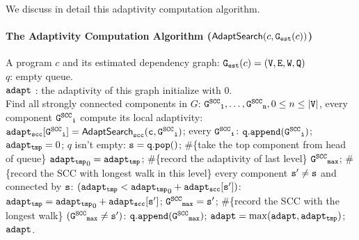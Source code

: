 We discuss in detail this adaptivity computation algorithm.
\paragraph*{The Adaptivity Computation Algorithm ($\mathsf{AdaptSearch}(c, \mathtt{{G_{est}}}(c))$)}
\begin{algorithm}
 \caption{
 {Adaptivity Computation Algorithm ({$\kw{\pathsearch(c, \progG(c))}$})}
 }
 \label{alg:adapt}
 \begin{algorithmic}[1]
 \REQUIRE A program $c$ and
 its estimated dependency graph: $\mathtt{{G_{est}}}(c) = (\mathtt{V}, \mathtt{E}, \mathtt{W}, \mathtt{Q})$
 \\
 $q$: empty queue.
 \\
 $\mathtt{adapt}$ : the adaptivity of this graph initialize with $0$.
 \\
 \STATE Find all strongly connected components in $G$: $\mathtt{\mathtt{G^{SCC}}_1}, \ldots, \mathtt{\mathtt{G^{SCC}}_n}, 0 \leq n \leq |\mathtt{V}|$, 
  every component $\mathtt{\mathtt{G^{SCC}}_i}$ compute its local adaptivity:
 \STATE \quad $\mathtt{adapt_{scc}[\mathtt{G^{SCC}}_i] = \mathsf{AdaptSearch}_{scc}(c, \mathtt{G^{SCC}}_i)}$;
  every $\mathtt{\mathtt{G^{SCC}}_i}$:
 \STATE \qquad $\mathtt{q.append(\mathtt{G^{SCC}}_i)}$;
 \STATE \qquad $\mathtt{adapt_{tmp}} = 0$;
 \STATE {} $q$ isn't empty:
 \STATE \qquad \qquad $\mathtt{s = q.pop()}$; \#\{take the top component from head of queue\}
 \STATE \qquad \qquad $\mathtt{adapt_{tmp}}_0= \mathtt{adapt_{tmp}}$; \#\{record the adaptivity of last level\}
 \STATE \qquad \qquad $\mathtt{\mathtt{G^{SCC}}_{max}}$; \#\{record the SCC with longest walk in this level\}
 \STATE \qquad {} every component $\mathtt{s'\neq s}$ and connected by $\mathtt{s}$:
 \STATE \qquad \qquad {} $(\mathtt{adapt_{tmp}} < \mathtt{adapt_{tmp}}_0 + \mathtt{adapt_{scc}[s']})$:
 \STATE \qquad \qquad \qquad \qquad $\mathtt{adapt_{tmp}} = \mathtt{adapt_{tmp}}_0 + \mathtt{adapt_{scc}[s']}$; 
 \STATE \qquad \qquad \qquad \qquad $\mathtt{\mathtt{G^{SCC}}_{max} = s'} $; 
 \#\{record the SCC with the longest walk\} 
 \STATE \qquad \qquad {} $(\mathtt{\mathtt{G^{SCC}}_{max}\neq s'})$:
 \STATE \qquad \qquad \qquad \qquad $\mathtt{q.append(\mathtt{G^{SCC}}_{max})}$;
 \STATE \qquad $\mathtt{adapt} = \max(\mathtt{adapt}, \mathtt{adapt_{tmp}})$; 
 \RETURN $\mathtt{adapt}$.
 \end{algorithmic}
 \end{algorithm}

